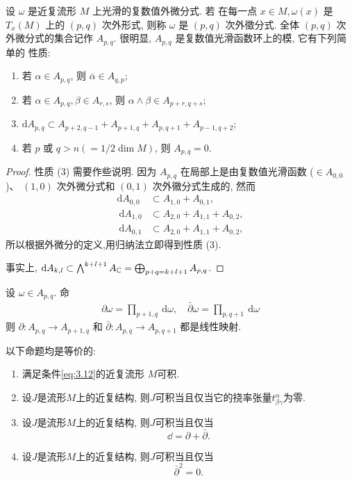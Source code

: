 \begin{definition}[][$(p,q)$次外微分式空间 $A_{p,q}$]
    设 $\omega$ 是近复流形 $M$ 上光滑的复数值外微分式. 若 在每一点 $x \in M, \omega(x)$ 是 $T_x(M)$ 上的 $(p, q)$ 次外形式, 则称 $\omega$ 是 $(p, q)$ 次外徵分式. 全体 $(p, q)$ 次外微分式的集合记作 $A_{p, q}$.
    很明显, $A_{p, q}$ 是复数值光滑函数环上的模, 它有下列简单的 性质:
    \begin{enumerate}[label=(\arabic*),font=\upshape]
        \item 若 $\alpha \in A_{p, q}$, 则 $\bar{\alpha} \in A_{q, p}$;
        \item 若 $\alpha \in A_{p, q}, \beta \in A_{r, s}$, 则 $\alpha \wedge \beta \in A_{p+r, q+s}$;
        \item {\color{VioletRed}$\mathrm{d} A_{p, q} \subset A_{p+2, q-1}+A_{p+1, q}+A_{p, q+1}+A_{p-1, q+2}$;}
        \item  若 $p$ 或 $q>n\left(=1/2 \operatorname{dim} M\right)$, 则 $A_{p, q}=0$.
    \end{enumerate}
\end{definition}
\begin{proof}
    性质 (3) 需要作些说明. 因为 $A_{p, q}$ 在局部上是由复数值光滑函数 ($\in A_{0,0}$)、 $(1,0)$ 次外微分式和 $(0,1)$ 次外幑分式生成的, 然而
        \begin{align*}
        \mathrm{d} A_{0,0} &\subset A_{1,0}+A_{0,1}, \\
        \mathrm{~d} A_{1,0} &\subset A_{2,0}+A_{1,1}+A_{0,2}, \\
        \mathrm{~d} A_{0,1} &\subset A_{2,0}+A_{1,1}+A_{0,2},
        \end{align*}
        所以根据外微分的定义,用归纳法立即得到性质 (3).

        事实上, $\dd A_{k,l} \subset \bigwedge^{k+l+1} A_{\mathbb C} =\bigoplus_{p+q=k+l+1}A_{p,q}$.
\end{proof}

设 $\omega \in A_{p, q}$. 命
        \begin{align}
        \partial \omega=\prod_{p+1, q} \mathrm{~d} \omega, \quad \bar{\partial} \omega=\prod_{p, q+1} \mathrm{~d} \omega
        \end{align}
则 $\partial: A_{p, q} \rightarrow A_{p+1, q}$ 和 $\bar{\partial}: A_{p, q} \rightarrow A_{p, q+1}$ 都是线性映射.

\begin{theorem}[][近复流形可积充要条件]
    以下命题均是等价的:
    \begin{enumerate}[font=\upshape]
        \item 满足条件\eqref{eq:3.12}的近复流形 $M$可积.
        \item 设$J$是流形$M$上的近复结构, 则$J$可积当且仅当它的挠率张量$t_{\beta\gamma}^\alpha$为零. 
        \item 设$J$是流形$M$上的近复结构, 则$J$可积当且仅当\[\dd=\partial+\bar{\partial}.\]
        \item 设$J$是流形$M$上的近复结构, 则$J$可积当且仅当 \[\bar{\partial}^2=0.\]
    \end{enumerate}
\end{theorem}

